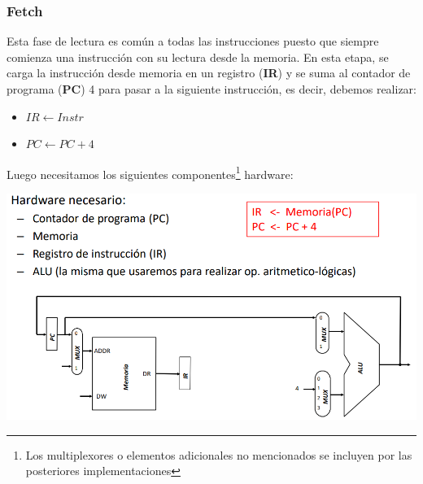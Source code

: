 \documentclass[a4paper,10pt]{book}
\begin{document}
\subsubsection*{Fetch}
Esta fase de lectura es común a todas las instrucciones puesto que siempre comienza una instrucción con su lectura desde la memoria. En esta etapa, se carga la instrucción desde memoria en un registro (\textbf{IR}) y se suma al contador de programa (\textbf{PC}) 4 para pasar a la siguiente instrucción, es decir, debemos realizar:
\begin{itemize}
\item $IR \leftarrow Instr$
\item $PC \leftarrow PC+4$
\end{itemize}
Luego necesitamos los siguientes componentes\footnote{Los multiplexores o elementos adicionales no mencionados se incluyen por las posteriores implementaciones} hardware:
\begin{center}
\includegraphics[scale=0.5]{fetch}
\end{center}
\end{document}
